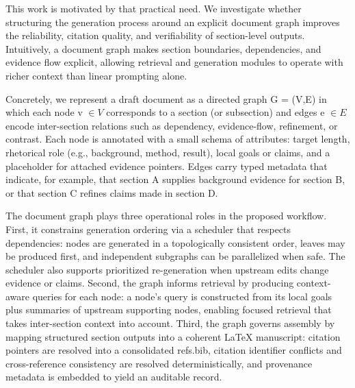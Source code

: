 \documentclass{article}%
\begin{document}
This work is motivated by that practical need.
We investigate whether structuring the generation process around an explicit document graph improves the reliability, citation quality, and verifiability of section-level outputs.
Intuitively, a document graph makes section boundaries, dependencies, and evidence flow explicit, allowing retrieval and generation modules to operate with richer context than linear prompting alone.

Concretely, we represent a draft document as a directed graph G = (V,E) in which each node v $\in V$ corresponds to a section (or subsection) and edges e $\in E$ encode inter-section relations such as dependency, evidence-flow, refinement, or contrast.
Each node is annotated with a small schema of attributes: target length, rhetorical role (e.g., background, method, result), local goals or claims, and a placeholder for attached evidence pointers.
Edges carry typed metadata that indicate, for example, that section A supplies background evidence for section B, or that section C refines claims made in section D.

The document graph plays three operational roles in the proposed workflow.
First, it constrains generation ordering via a scheduler that respects dependencies: nodes are generated in a topologically consistent order, leaves may be produced first, and independent subgraphs can be parallelized when safe.
The scheduler also supports prioritized re-generation when upstream edits change evidence or claims.
Second, the graph informs retrieval by producing context-aware queries for each node: a node's query is constructed from its local goals plus summaries of upstream supporting nodes, enabling focused retrieval that takes inter-section context into account.
Third, the graph governs assembly by mapping structured section outputs into a coherent LaTeX manuscript: citation pointers are resolved into a consolidated refs.bib, citation identifier conflicts and cross-reference consistency are resolved deterministically, and provenance metadata is embedded to yield an auditable record.
\end{document}
